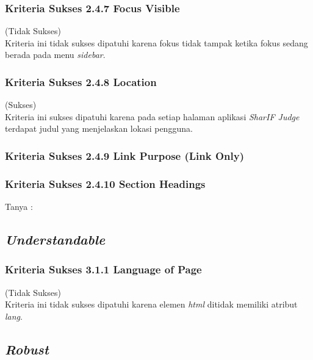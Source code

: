 \subsubsection{Kriteria Sukses 2.4.7 Focus Visible}
\label{subsubsec:kepatuhan_kriteria_2.4.7}
(Tidak Sukses) \\

Kriteria ini tidak sukses dipatuhi karena fokus tidak tampak ketika fokus sedang berada pada menu \textit{sidebar}.

\subsubsection{Kriteria Sukses 2.4.8 Location}
\label{subsubsec:kepatuhan_kriteria_2.4.8}
(Sukses) \\

Kriteria ini sukses dipatuhi karena pada setiap halaman aplikasi \textit{SharIF Judge} terdapat judul yang menjelaskan lokasi pengguna.

\subsubsection{Kriteria Sukses 2.4.9 Link Purpose (Link Only)}
\label{subsubsec:kepatuhan_kriteria_2.4.9}

\subsubsection{Kriteria Sukses 2.4.10 Section Headings}
\label{subsubsec:kepatuhan_kriteria_2.4.10}

Tanya : 

\subsection{\textit{Understandable}}
\label{subsec:kepatuhan_understandable}

\subsubsection{Kriteria Sukses 3.1.1 Language of Page}
\label{subsubsec:kepatuhan_kriteria_3.1.1}
(Tidak Sukses) \\

Kriteria ini tidak sukses dipatuhi karena elemen \textit{html} ditidak memiliki atribut \textit{lang}.

\subsection{\textit{Robust}}
\label{subsec:kepatuhan_robust}

